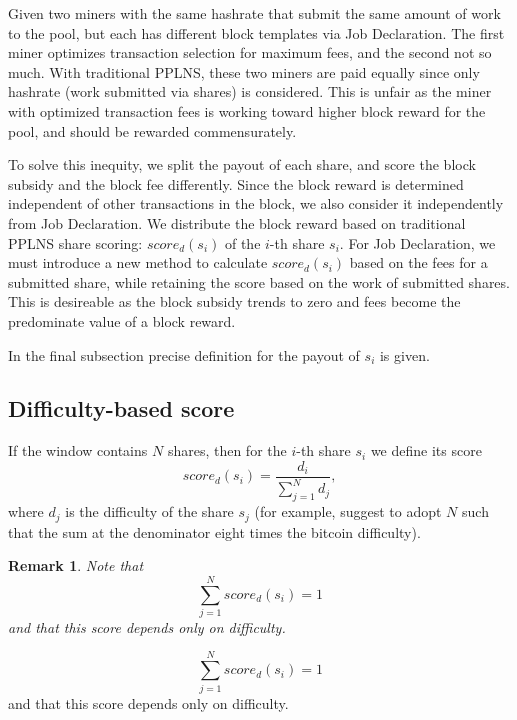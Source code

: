 \documentclass[11pt]{article}
\newtheorem{remark}{Remark}[subsection]
\begin{document}
Given two miners with the same hashrate that submit the same amount of work to the pool, but each has different block templates via Job Declaration. The first miner optimizes transaction selection for maximum fees, and the second not so much. With traditional PPLNS, these two miners are paid equally since only hashrate (work submitted via shares) is considered. This is unfair as the miner with optimized transaction fees is working toward higher block reward for the pool, and should be rewarded commensurately.

To solve this inequity, we split the payout of each share, and score the block subsidy and the block fee differently. Since the block reward is determined independent of other transactions in the block, we also consider it independently from Job Declaration. We distribute the block reward based on traditional PPLNS share scoring: $score_d(s_i)$ of the $i$-th share $s_i$.\newline
For Job Declaration, we must introduce a new method to calculate $score_d(s_i)$ based on the fees for a submitted share, while retaining the score based on the work of submitted shares. This is desireable as the block subsidy trends to zero and fees become the predominate value of a block reward. 

In the final subsection precise definition for the payout of $s_i$ is given.

\subsection{Difficulty-based score}
If the window contains $N$ shares, then for the $i$-th share $s_i$ we define its score
\[score_d(s_i) = \frac{d_i}{\sum_{j=1}^Nd_j},\]
where $d_j$ is the difficulty of the share $s_j$ (for example, \cite{ocean} suggest to adopt $N$ such that the sum at the denominator eight times the bitcoin difficulty).\newline
\begin{remark}
	Note that
	\[\sum_{j=1}^N score_d(s_i) = 1\] and that this score depends only on difficulty.
\end{remark}
\[\sum_{j=1}^N score_d(s_i) = 1\] and that this score depends only on difficulty.
\end{document}
